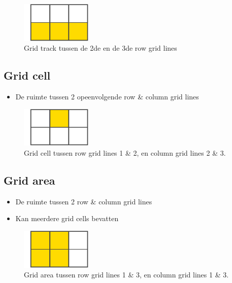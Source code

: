 \documentclass{article}
\begin{document}
\begin{figure}[H]
    \centering
    \includegraphics[width=0.3\textwidth]{grid-track.png}
    \caption{Grid track tussen de 2de en de 3de row grid lines}
\end{figure}

\subsection{Grid cell}

\begin{itemize}
    \item De ruimte tussen 2 opeenvolgende row \& column grid lines
\end{itemize}

\begin{figure}[H]
    \centering
    \includegraphics[width=0.3\textwidth]{grid-cell.png}
    \caption{Grid cell tussen row grid lines 1 \& 2, en column grid lines 2 \& 3.}
\end{figure}

\subsection{Grid area}

\begin{itemize}
    \item De ruimte tussen 2 row \& column grid lines
    \item Kan meerdere grid cells bevatten
\end{itemize}

\begin{figure}[H]
    \centering
    \includegraphics[width=0.3\textwidth]{grid-area.png}
    \caption{Grid area tussen row grid lines 1 \& 3, en column grid lines 1 \& 3.}
\end{figure}
\end{document}
